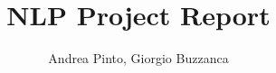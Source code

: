\documentclass[12pt,a4paper,openany,oneside]{book}
\begin{document}



\title{NLP Project Report}
\author{Andrea Pinto, Giorgio Buzzanca}

%

\tableofcontents







\newpage
{}

\end{document}
